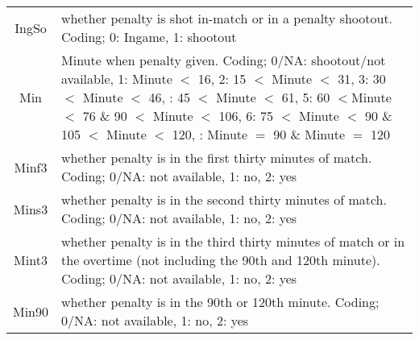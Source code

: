 \documentclass[12pt,dvipsnames]{article}%
\begin{document}
\begin{table}[h]
\begin{tabular}{ c | p{12cm}  }
IngSo & whether penalty is shot in-match or in a penalty shootout. Coding; 0: Ingame, 1: shootout \\

Min & Minute when penalty given. Coding; 0/NA: shootout/not available, 1: Minute $<$ 16, 2: 15 $<$ Minute $<$ 31, 3: 30 $<$ Minute $<$ 46, \newline 4: 45 $<$ Minute $<$ 61, 5: 60 $< $Minute $<$ 76 \& 90 $<$ Minute $<$ 106, 6: 75 $<$ Minute $<$ 90 \& 105 $<$ Minute $<$ 120, \newline  7:  Minute $=$ 90 \& Minute $=$ 120 \\

Minf3 & whether penalty is in the first thirty minutes of match. Coding; 0/NA: not available, 1: no, 2: yes \\

Mins3 & whether penalty is in the second thirty minutes of match. Coding; 0/NA: not available, 1: no, 2: yes \\

Mint3 & whether penalty is in the third thirty minutes of match or in the overtime (not including the 90th and 120th minute). Coding; 0/NA: not available, 1: no, 2: yes \\

Min90 & whether penalty is in the 90th or 120th minute. Coding; 0/NA: not available, 1: no, 2: yes \\

 \end{tabular}
 \end{table}

\pagebreak
\end{document}
